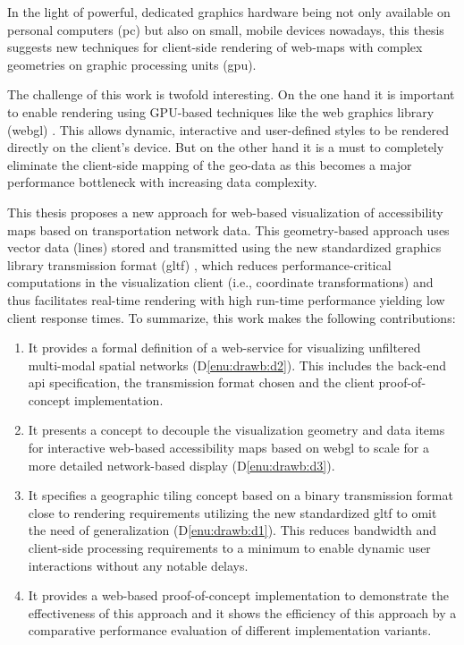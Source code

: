     In the light of powerful, dedicated graphics hardware being not only
    available on personal computers (\acrshort{pc}) but also
    on small, mobile devices nowadays, this thesis suggests new techniques for
    client-side rendering of web-maps with complex geometries on graphic
    processing units (\acrshort{gpu}).\par

    The challenge of this work is twofold interesting. On the one hand it is
    important to enable rendering using GPU-based techniques like
    the web graphics library (\acrshort{webgl}) \cite{Jackson2016}.
    This allows dynamic, interactive and user-defined styles to be rendered
    directly on the client's device. But on the other hand it is a must to
    completely eliminate the client-side mapping of the geo-data as this becomes
    a major performance bottleneck with increasing data complexity.\par

    This thesis proposes a new approach for web-based visualization of
    accessibility maps based on transportation network data. This geometry-based
    approach uses vector data (lines) stored and transmitted using the new
    standardized graphics library transmission format (\acrshort{gltf})
    \cite{Cozzi2015}, which reduces performance-critical
    computations in the visualization client (i.e., coordinate transformations)
    and thus facilitates real-time rendering with high run-time performance
    yielding low client response times. To summarize, this work makes the
    following contributions:\par

    \begin{enumerate}[\label=({C}1)]
      \item \label{enu:contr:c1} It provides a formal definition of a
        web-service for visualizing unfiltered multi-modal spatial networks
        (D\ref{enu:drawb:d2}).
        This includes the back-end \acrshort{api} specification, the
        transmission format chosen and the client proof-of-concept
        implementation.
      \item \label{enu:contr:c2} It presents a concept to decouple the
        visualization geometry and data items for interactive web-based
        accessibility maps based on \acrshort{webgl} to scale for a more
        detailed network-based display (D\ref{enu:drawb:d3}).
      \item \label{enu:contr:c3} It specifies a geographic tiling concept based
        on a binary transmission format close to rendering requirements
        utilizing the new standardized \acrshort{gltf} to omit the need of
        generalization (D\ref{enu:drawb:d1}). This reduces bandwidth
        and client-side processing requirements to a minimum to enable dynamic
        user interactions without any notable delays.
      \item \label{enu:contr:c4} It provides a web-based proof-of-concept
        implementation to demonstrate the effectiveness of this approach and
        it shows the efficiency of this approach by a comparative performance
        evaluation of different implementation variants.
    \end{enumerate}

